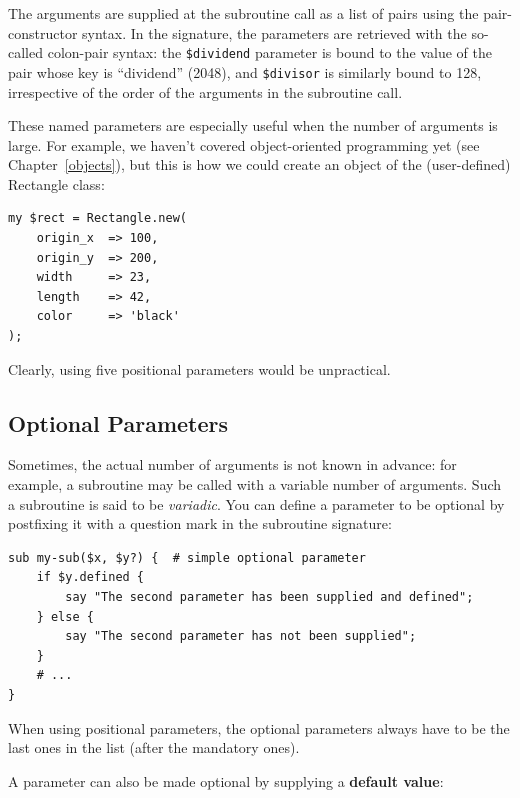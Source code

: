 The arguments are supplied at the subroutine call as a list of 
pairs using the pair-constructor syntax. In the signature, 
the parameters are retrieved with the 
so-called colon-pair syntax: the \verb'$dividend' parameter is 
bound to the value of the pair whose key is ``dividend'' (2048), 
and \verb'$divisor' is similarly bound to 128, irrespective of 
the order of the arguments in the subroutine call.

These named parameters are especially useful when the number of 
arguments is large. For example, we haven't covered 
object-oriented programming yet (see Chapter~\ref{objects}), 
but this is how we could create an object of the 
(user-defined) Rectangle class:

\begin{verbatim}
my $rect = Rectangle.new( 
    origin_x  => 100, 
    origin_y  => 200, 
    width     => 23,
    length    => 42,
    color     => 'black'
);
\end{verbatim}

Clearly, using five positional parameters would be unpractical. 

\subsection{Optional Parameters}

Sometimes, the actual number of arguments is not known 
in advance: for example, a subroutine may be called with 
a variable number of arguments. Such a subroutine is said 
to be \emph{variadic}. You can define a parameter to be 
optional by postfixing it with a question mark in the 
subroutine signature:

\begin{verbatim}
sub my-sub($x, $y?) {  # simple optional parameter
    if $y.defined {
        say "The second parameter has been supplied and defined";
    } else {
        say "The second parameter has not been supplied";
    }
    # ...
}
\end{verbatim}

When using positional parameters, the optional parameters 
always have to be the last ones in the list (after the 
mandatory ones).

A parameter can also be made optional by supplying a 
{\bf default value}:

